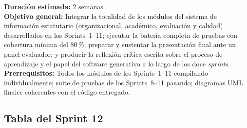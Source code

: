 \begin{tcolorbox}[sprintBox, title={Sprint 12 --- Integración, entrega final y reflexión crítica}]
  \textbf{Duración estimada:} 2 semanas \\[4pt]
  \textbf{Objetivo general:} Integrar la totalidad de los módulos del sistema
  de información estatutario (organizacional, académico, evaluación y calidad)
  desarrollados en los Sprints~1--11; ejecutar la batería completa de pruebas
  con cobertura mínima del 80\,\%; preparar y sustentar la presentación final
  ante un panel evaluador; y producir la reflexión crítica escrita sobre el
  proceso de aprendizaje y el papel del software generativo a lo largo de los
  doce \textit{sprints}. \\[4pt]
  \textbf{Prerrequisitos:} Todos los módulos de los Sprints~1--11 compilando
  individualmente; suite de pruebas de los Sprints~8--11 pasando; diagramas UML
  finales coherentes con el código entregado.
\end{tcolorbox}

\bigskip

\subsection*{Tabla del Sprint 12}
\label{tab:sprint12-header}

